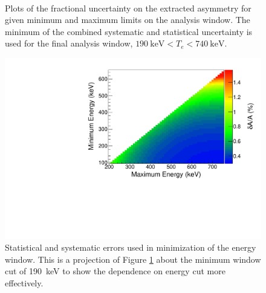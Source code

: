 \begin{figure}[p]
   \\ 
  \caption{Plots of the fractional uncertainty on the extracted asymmetry for given minimum and maximum limits
    on the analysis window. The minimum of the combined systematic and statistical uncertainty is used for the
    final analysis window, $190\mathrm{~keV} < T_e < 740\mathrm{~keV}$.}
  \label{fig:enWindow}
\end{figure}


\begin{figure}[h]
\centering
\includegraphics[page=6,scale=.5]{5-UCNAResults/TwoDimUncert.pdf}
\caption{Statistical and systematic errors used in minimization of the energy window. This is a projection
  of Figure \ref{fig:enWindow} about the minimum window cut of 190~keV to show the dependence on energy cut
  more effectively.}
\label{fig:enWindow1D}
\end{figure}

